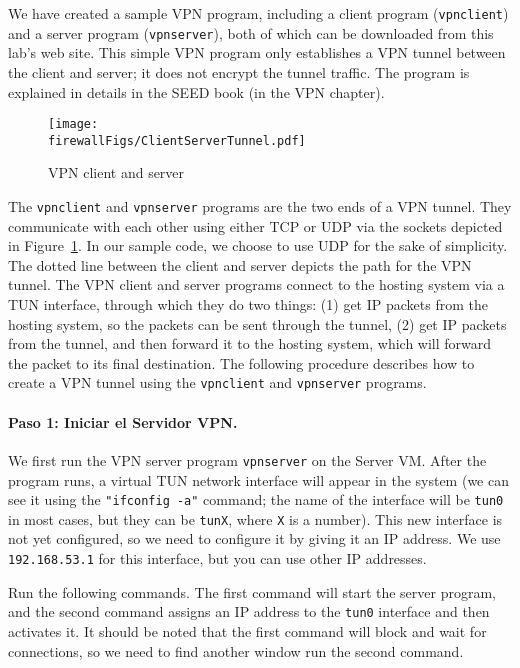 We have created a sample VPN program, including a client program (\texttt{vpnclient})  and
a server program (\texttt{vpnserver}), both of which can be downloaded from
this lab's web site. This simple VPN program only establishes a VPN tunnel 
between the client and server; it does not encrypt the tunnel traffic.
The program is explained in details in the SEED book (in the VPN chapter).


\begin{figure}[htb]
\begin{center}
\texttt{[image: \\firewallFigs/ClientServerTunnel.pdf]}
\end{center}
\caption{VPN client and server}
\label{vpn_firewall:fig:client_server}
\end{figure}

The \texttt{vpnclient} and \texttt{vpnserver} programs are the two ends of
a VPN tunnel. They communicate with each other using either TCP or UDP via the sockets
depicted in Figure~\ref{vpn_firewall:fig:client_server}. In our sample code, we choose
to use UDP for the sake of simplicity.  The dotted line between the
client and server depicts the path for the VPN tunnel.
The VPN client and server programs connect to the hosting system via a
TUN interface, through which they do two things: (1) get IP packets from
the hosting system, so the packets can be sent through the tunnel, (2) get IP packets from the
tunnel, and then forward it to the hosting system, which will forward the
packet to its final destination.
The following procedure describes how to create a VPN tunnel
using the \texttt{vpnclient} and \texttt{vpnserver} programs.


\paragraph{Paso 1: Iniciar el Servidor VPN.}
We first run the VPN server program \texttt{vpnserver} on the Server VM.
After the program runs, a virtual TUN network interface will appear
in the system (we can see it using the \texttt{"ifconfig -a"} command; the name of the
interface will be \texttt{tun0} in most cases, but they can be
\texttt{tunX}, where \texttt{X} is a number).
This new interface is not yet configured, so we need to configure it by giving it an IP
address. We use \texttt{192.168.53.1} for this interface, but you can use 
other IP addresses. 


Run the following commands. The first command will start the server
program, and the second command assigns an IP address to the \texttt{tun0}
interface and then activates it. It should be noted that the first
command will block and wait for connections,
so we need to find another window run the second command.


